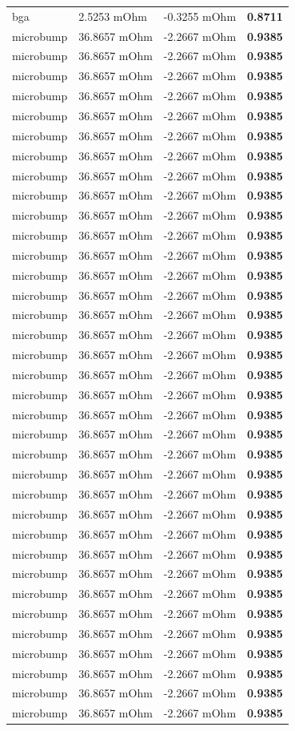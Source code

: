 \documentclass[10pt,]{article}
\begin{document}
\begin{longtable}[]{@{}llll@{}}
bga & 2.5253 mOhm & -0.3255 mOhm & \textbf{0.8711}\tabularnewline
microbump & 36.8657 mOhm & -2.2667 mOhm & \textbf{0.9385}\tabularnewline
microbump & 36.8657 mOhm & -2.2667 mOhm & \textbf{0.9385}\tabularnewline
microbump & 36.8657 mOhm & -2.2667 mOhm & \textbf{0.9385}\tabularnewline
microbump & 36.8657 mOhm & -2.2667 mOhm & \textbf{0.9385}\tabularnewline
microbump & 36.8657 mOhm & -2.2667 mOhm & \textbf{0.9385}\tabularnewline
microbump & 36.8657 mOhm & -2.2667 mOhm & \textbf{0.9385}\tabularnewline
microbump & 36.8657 mOhm & -2.2667 mOhm & \textbf{0.9385}\tabularnewline
microbump & 36.8657 mOhm & -2.2667 mOhm & \textbf{0.9385}\tabularnewline
microbump & 36.8657 mOhm & -2.2667 mOhm & \textbf{0.9385}\tabularnewline
microbump & 36.8657 mOhm & -2.2667 mOhm & \textbf{0.9385}\tabularnewline
microbump & 36.8657 mOhm & -2.2667 mOhm & \textbf{0.9385}\tabularnewline
microbump & 36.8657 mOhm & -2.2667 mOhm & \textbf{0.9385}\tabularnewline
microbump & 36.8657 mOhm & -2.2667 mOhm & \textbf{0.9385}\tabularnewline
microbump & 36.8657 mOhm & -2.2667 mOhm & \textbf{0.9385}\tabularnewline
microbump & 36.8657 mOhm & -2.2667 mOhm & \textbf{0.9385}\tabularnewline
microbump & 36.8657 mOhm & -2.2667 mOhm & \textbf{0.9385}\tabularnewline
microbump & 36.8657 mOhm & -2.2667 mOhm & \textbf{0.9385}\tabularnewline
microbump & 36.8657 mOhm & -2.2667 mOhm & \textbf{0.9385}\tabularnewline
microbump & 36.8657 mOhm & -2.2667 mOhm & \textbf{0.9385}\tabularnewline
microbump & 36.8657 mOhm & -2.2667 mOhm & \textbf{0.9385}\tabularnewline
microbump & 36.8657 mOhm & -2.2667 mOhm & \textbf{0.9385}\tabularnewline
microbump & 36.8657 mOhm & -2.2667 mOhm & \textbf{0.9385}\tabularnewline
microbump & 36.8657 mOhm & -2.2667 mOhm & \textbf{0.9385}\tabularnewline
microbump & 36.8657 mOhm & -2.2667 mOhm & \textbf{0.9385}\tabularnewline
microbump & 36.8657 mOhm & -2.2667 mOhm & \textbf{0.9385}\tabularnewline
microbump & 36.8657 mOhm & -2.2667 mOhm & \textbf{0.9385}\tabularnewline
microbump & 36.8657 mOhm & -2.2667 mOhm & \textbf{0.9385}\tabularnewline
microbump & 36.8657 mOhm & -2.2667 mOhm & \textbf{0.9385}\tabularnewline
microbump & 36.8657 mOhm & -2.2667 mOhm & \textbf{0.9385}\tabularnewline
microbump & 36.8657 mOhm & -2.2667 mOhm & \textbf{0.9385}\tabularnewline
microbump & 36.8657 mOhm & -2.2667 mOhm & \textbf{0.9385}\tabularnewline
microbump & 36.8657 mOhm & -2.2667 mOhm & \textbf{0.9385}\tabularnewline
microbump & 36.8657 mOhm & -2.2667 mOhm & \textbf{0.9385}\tabularnewline
microbump & 36.8657 mOhm & -2.2667 mOhm & \textbf{0.9385}\tabularnewline
microbump & 36.8657 mOhm & -2.2667 mOhm & \textbf{0.9385}\tabularnewline

\end{longtable}
\end{document}
